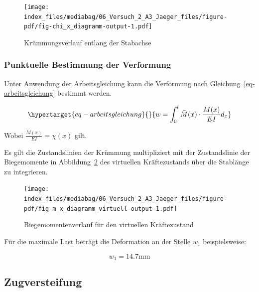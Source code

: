 \documentclass[
  letterpaper,
]{scrreprt}
\begin{document}
\begin{figure}[H]

{\centering \texttt{[image: index\_files/mediabag/06\_Versuch\_2\_A3\_Jaeger\_files/figure-pdf/fig-chi\_x\_diagramm-output-1.pdf]}

}

\caption{\label{fig-chi_x_diagramm}Krümmungsverlauf entlang der
Stabachse}

\end{figure}

\hypertarget{punktuelle-bestimmung-der-verformung}{%
\subsubsection{Punktuelle Bestimmung der
Verformung}\label{punktuelle-bestimmung-der-verformung}}

Unter Anwendung der Arbeitsgleichung kann die Verformung nach
Gleichung~\ref{eq-arbeitsgleichung} bestimmt werden.

\begin{equation}\protect\hypertarget{eq-arbeitsgleichung}{}{
w = \int_0^l \bar{M}(x) \cdot \frac{M(x)}{EI} d_x
}\label{eq-arbeitsgleichung}\end{equation}

Wobei \(\frac{M(x)}{EI} = \chi(x)\) gilt.

Es gilt die Zustandslinien der Krümmung multipliziert mit der
Zustandslinie der Biegemomente in
Abbildung~\ref{fig-m_x_diagramm_virtuell} des virtuellen Kräftezustands
über die Stablänge zu integrieren.

\begin{figure}[H]

{\centering \texttt{[image: index\_files/mediabag/06\_Versuch\_2\_A3\_Jaeger\_files/figure-pdf/fig-m\_x\_diagramm\_virtuell-output-1.pdf]}

}

\caption{\label{fig-m_x_diagramm_virtuell}Biegemomentenverlauf für den
virtuellen Kräftezustand}

\end{figure}

Für die maximale Last beträgt die Deformation an der Stelle \(w_1\)
beispielsweise:

\begin{equation}w_{1} = 14.7 \text{mm}\end{equation}

\hypertarget{zugversteifung}{%
\subsection{Zugversteifung}\label{zugversteifung}}
\end{document}
